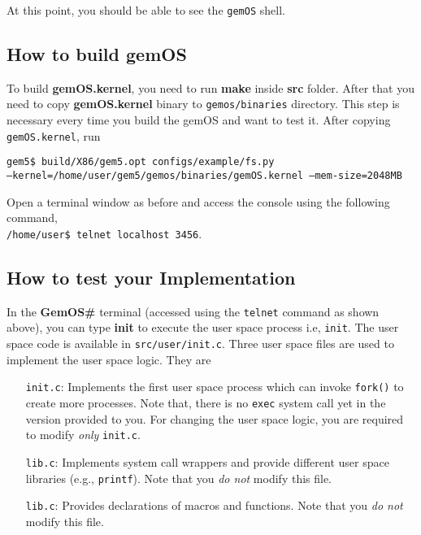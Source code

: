 \documentclass[12pt]{article}
\begin{document}
\vspace{0.25cm}
\noindent
At this point, you should be able to see the \texttt{gemOS} shell. 

\subsection{How to build gemOS}

To build \textbf{gemOS.kernel}, you need to run \textbf{make} inside \textbf{src} folder. 
After that you need to copy \textbf{gemOS.kernel} binary to \texttt{gemos/binaries} directory. 
This step is necessary every time you build the gemOS and want to test it.
After copying \texttt{gemOS.kernel}, run\\ \newline

\vspace{0.25cm}
\noindent
\texttt{gem5\$ build/X86/gem5.opt configs/example/fs.py} \\ {\tt --kernel=/home/user/gem5/gemos/binaries/gemOS.kernel --mem-size=2048MB}
\vspace{0.25cm}

\noindent
Open a terminal window as before and access the console using the following command, \\

\noindent
\texttt{/home/user\$ telnet localhost 3456}.

\subsection{How to test your Implementation}

In the \textbf{GemOS\#} terminal (accessed using the {\tt telnet} command as shown above),
you can type \textbf{init} to execute the user space process i.e, {\tt init}. 
The user space code is available in {\tt src/user/init.c}. Three user space files are used to implement the
user space logic. They are
\begin{itemize}
    \item[{\tt init.c}:] Implements the first user space process which can invoke {\tt fork()} to create more processes. Note that, there
    is no {\tt exec} system call yet in the version provided to you. For changing the user space logic, you are required to modify {\em only} 
    {\tt init.c}.
\item[{\tt lib.c}:] Implements system call wrappers and provide different user space libraries (e.g., {\tt printf}). 
    Note that you {\em do not} modify this file.
\item[{\tt lib.c}:] Provides declarations of macros and functions.
    Note that you {\em do not} modify this file.
\end{itemize}
\end{document}
